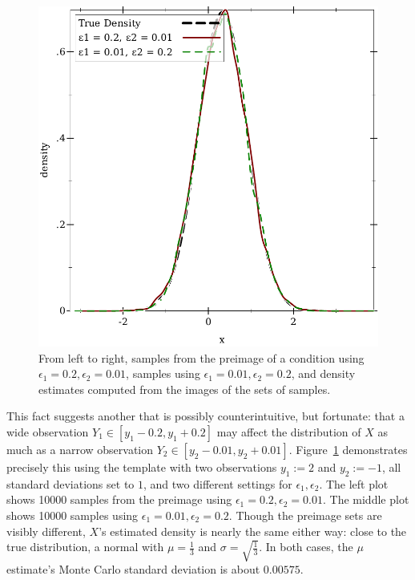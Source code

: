 \begin{figure}[tb!]
\includegraphics[width=\subfigurewidth]{figures/normal-normals-density}%
\caption[Inference with $\epsilon_i$ of differing magnitudes]{From left to right, samples from the preimage of a condition using $\epsilon_1 = 0.2,\epsilon_2 = 0.01$, samples using $\epsilon_1 = 0.01,\epsilon_2 = 0.2$, and density estimates computed from the images of the sets of samples.}%
\label{fig:normal-normals}
\end{figure}

This fact suggests another that is possibly counterintuitive, but fortunate: that a wide observation $\mathit{Y_1} \in [y_1-0.2,y_1+0.2]$ may affect the distribution of $\mathit{X}$ as much as a narrow observation $\mathit{Y_2} \in [y_2-0.01,y_2+0.01]$.
Figure~\ref{fig:normal-normals} demonstrates precisely this using the  template with two observations $y_1 := 2$ and $y_2 := -1$, all standard deviations set to $1$, and two different settings for $\epsilon_1,\epsilon_2$.
The left plot shows 10000 samples from the preimage using $\epsilon_1 = 0.2,\epsilon_2 = 0.01$.
The middle plot shows 10000 samples using $\epsilon_1 = 0.01,\epsilon_2 = 0.2$.
Though the preimage sets are visibly different, $\mathit{X}$'s estimated density is nearly the same either way: close to the true distribution, a normal with $\mu = \frac{1}{3}$ and $\sigma = \sqrt{\frac{1}{3}}$.
In both cases, the $\mu$ estimate's Monte Carlo standard deviation is about $0.00575$.

